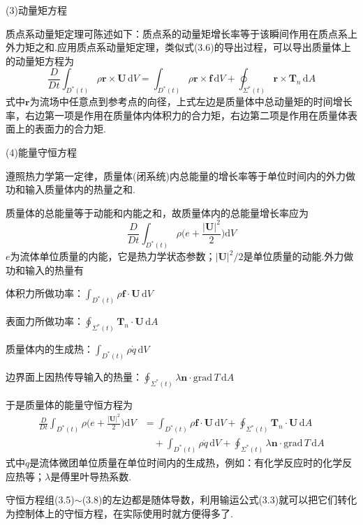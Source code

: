 (3)动量矩方程

质点系动量矩定理可陈述如下：质点系的动量矩增长率等于该瞬间作用在质点系上外力矩之和.应用质点系动量矩定理，类似式(3.6)的导出过程，可以导出质量体上的动量矩方程为
\begin{equation*}
\frac{D}{Dt}\int_{D^{*}(t)}\rho\boldsymbol{r}\times\boldsymbol{U}\,\mathrm{d}V=\int_{D^{*}(t)}\rho\boldsymbol{r}\times\boldsymbol{f}\,\mathrm{d}V+\oint_{\Sigma^{*}(t)}\boldsymbol{r}\times\boldsymbol{T}_n\,\mathrm{d}A
\tag{3.7}
\end{equation*}
式中$\boldsymbol{r}$为流场中任意点到参考点的向径，上式左边是质量体中总动量矩的时间增长率，右边第一项是作用在质量体内体积力的合力矩，右边第二项是作用在质量体表面上的表面力的合力矩.

(4)能量守恒方程

遵照热力学第一定律，质量体(闭系统)内总能量的增长率等于单位时间内的外力做功和输入质量体内的热量之和.

质量体的总能量等于动能和内能之和，故质量体内的总能量增长率应为
\[
\frac{D}{Dt}\int_{D^{*}(t)}\rho\Big(e+\frac{|\boldsymbol{U}|^{2}}{2}\Big)\mathrm{d}V
\]
$e$为流体单位质量的内能，它是热力学状态参数；$|\boldsymbol{U}|^{2}/2$是单位质量的动能.外力做功和输入的热量有

体积力所做功率：$\displaystyle\int_{D^{*}(t)}\rho\boldsymbol{f}\cdot\boldsymbol{U}\,\mathrm{d}V$

表面力所做功率：$\displaystyle\oint_{\Sigma^{*}(t)}\boldsymbol{T}_n\cdot\boldsymbol{U}\,\mathrm{d}A$

质量体内的生成热：$\displaystyle\int_{D^{*}(t)}\rho\dot{q}\,\mathrm{d}V$

边界面上因热传导输入的热量：$\displaystyle\oint_{\Sigma^{*}(t)}\lambda\boldsymbol{n}\cdot\mathrm{grad}\,T\,\mathrm{d}A$

于是质量体的能量守恒方程为
\begin{align*}
\frac{D}{Dt}\int_{D^{*}(t)}\rho\Big(e+\frac{|\boldsymbol{U}|^{2}}{2}\Big)\mathrm{d}V&=\int_{D^{*}(t)}\rho\boldsymbol{f}\cdot\boldsymbol{U}\,\mathrm{d}V+\oint_{\Sigma^{*}(t)}\boldsymbol{T}_n\cdot\boldsymbol{U}\,\mathrm{d}A\\
&\quad+\int_{D^{*}(t)}\rho\dot{q}\,\mathrm{d}V+\oint_{\Sigma^{*}(t)}\lambda\boldsymbol{n}\cdot\mathrm{grad}\,T\,\mathrm{d}A
\tag{3.8}
\end{align*}
式中$\dot{q}$是流体微团单位质量在单位时间内的生成热，例如：有化学反应时的化学反应热等；$\lambda$是傅里叶导热系数.

守恒方程组(3.5)$\sim$(3.8)的左边都是随体导数，利用输运公式(3.3)就可以把它们转化为控制体上的守恒方程，在实际使用时就方便得多了.

